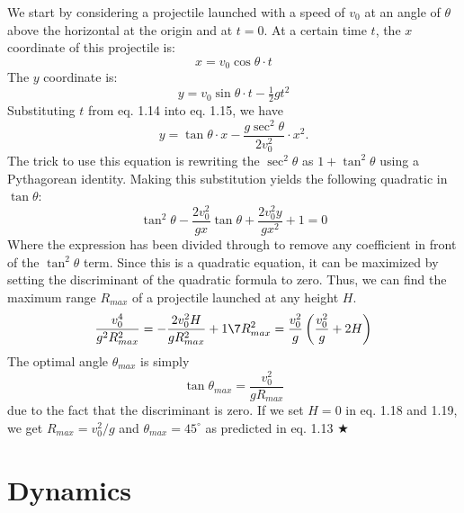 \noindent We start by considering a projectile launched with a speed of $v_0$ at an angle of $\theta$ above the horizontal at the origin and at $t=0$. At a certain time $t$, the $x$ coordinate of this projectile is:
\begin{equation}
    x = v_0\cos \theta \cdot t
\end{equation}
\noindent The $y$ coordinate is:
\begin{equation}
    y = v_0 \sin \theta \cdot t - \tfrac12 g t^2
\end{equation}
\noindent Substituting $t$ from eq. 1.14 into eq. 1.15, we have
\begin{equation}
    \boxed{y = \tan \theta \cdot x - \frac{g\sec^2{\theta}}{2v_0^2} \cdot x^2}.
\end{equation}
\noindent The trick to use this equation is rewriting the $\sec^2\theta$ as $1+\tan^2\theta$ using a Pythagorean identity. Making this substitution yields the following quadratic in $\tan \theta$:
\begin{equation}
    \tan^2\theta -\frac{2v_0^2}{gx}\tan\theta + \frac{2v_0^2 y}{gx^2} + 1 = 0
\end{equation}
\noindent Where the expression has been divided through to remove any coefficient in front of the $\tan^2\theta$ term.
\noindent Since this is a quadratic equation, it can be maximized by setting the discriminant of the quadratic formula to zero. Thus, we can find the maximum range $R_{max}$ of a projectile launched at any height $H$.
\begin{gather}
    \frac{v_0^4}{g^2R_{max}^2} = -\frac{2v_0^2H}{gR_{max}^2} + 1 \7
    R_{max}^2 = \frac{v_0^2}{g}\left( \frac{v_0^2}{g} + 2H \right)
\end{gather}
\noindent The optimal angle $\theta_{max}$ is simply
\begin{equation}
    \tan\theta_{max} = \frac{v_0^2}{gR_{max}}
\end{equation}
\noindent due to the fact that the discriminant is zero. If we set $H=0$ in eq. 1.18 and 1.19, we get $R_{max} = v_0^2/g$ and $\theta_{max} = 45^{\circ}$ as predicted in eq. 1.13 $\bigstar$

\clearpage

%
%
%
%

\section{Dynamics}

